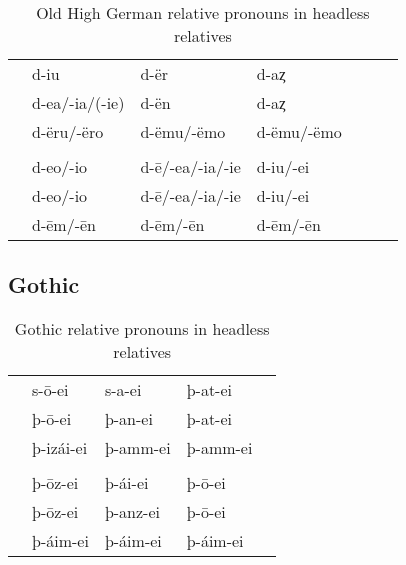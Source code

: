 \begin{table}[h]\label{tbl:paradigmohg}
	\center
	\caption {Old High German relative pronouns in headless relatives}
	\begin{minipage}{0.85\linewidth}
		\begin{tabularx}{\textwidth}{c *{6}{Y}}
		\toprule
			&           &            &     \\
		\midrule
		 & d-iu             & d-ër       	     & d-aȥ				\\
			& d-ea/-ia/(-ie)   & d-ën				       & d-aȥ		    \\
			& d-ëru/-ëro	     & d-ëmu/-ëmo	       & d-ëmu/-ëmo \\
		\bottomrule
    \toprule
    	&           &            &     \\
    \midrule
     & d-eo/-io         &  d-ē/-ea/-ia/-ie  & d-iu/-ei   \\
     & d-eo/-io         &  d-ē/-ea/-ia/-ie  & d-iu/-ei   \\
     & d-ēm/-ēn         &  d-ēm/-ēn         & d-ēm/-ēn   \\
    \bottomrule
		\end{tabularx}
	\end{minipage}
\end{table}


\subsection{Gothic}

\begin{table}[h]\label{tbl:paradigmgothic}
	\center
	\caption {Gothic relative pronouns in headless relatives}
	\begin{minipage}{0.7\linewidth}
		\begin{tabularx}{\textwidth}{c *{4}{Y}}
		\toprule
			&    &    &   \\
		\midrule
     & s-ō-ei 	  & s-a-ei 		& þ-at-ei	 \\
     & þ-ō-ei    & þ-an-ei  	& þ-at-ei  \\
     & þ-izái-ei & þ-amm-ei	& þ-amm-ei \\
		\bottomrule
    \toprule
    	&  	& 		& 		\\
    \midrule
     &	þ-ōz-ei		&	þ-ái-ei		& þ-ō-ei   	\\
     &	þ-ōz-ei		&	þ-anz-ei	& þ-ō-ei   	\\
     &	þ-áim-ei	&	þ-áim-ei 	& þ-áim-ei	\\
    \bottomrule
		\end{tabularx}
	\end{minipage}
\end{table}


